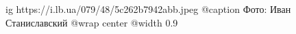  
 
 
 
 

\ifcmt
  ig https://i.lb.ua/079/48/5c262b7942abb.jpeg
	@caption Фото: Иван Станиславский
  @wrap center
  @width 0.9
\fi

